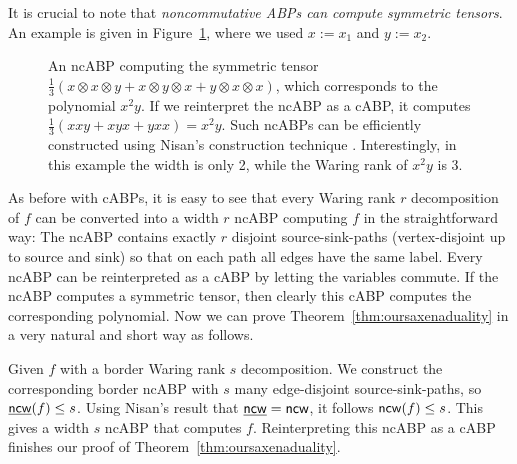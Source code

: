 \documentclass[10pt,a4paper]{article}
\numberwithin{equation}{section}
\theoremstyle{definition}
\newcommand{\ncw}{\textup{\textsf{ncw}}}
\begin{document}
It is crucial to note that \emph{noncommutative ABPs can compute symmetric tensors}.
An example is given in Figure~\ref{fig:ncabp}, where we used $x:=x_1$ and $y:=x_2$.
\begin{figure}
\centering
{}
\caption{An ncABP computing the symmetric tensor $\frac 1 3 (x\otimes x\otimes y + x\otimes y\otimes x + y\otimes x\otimes x)$, which corresponds to the polynomial $x^2 y$.
If we reinterpret the ncABP as a cABP, it computes $\frac 1 3 (xxy + xyx + yxx)= x^2 y$.
Such ncABPs can be efficiently constructed using Nisan's construction technique \cite{nisan1991lower}. Interestingly, in this example the width is only 2, while the Waring rank of $x^2 y$ is 3.}
\label{fig:ncabp}
\end{figure}
As before with cABPs, it is easy to see that every Waring rank $r$ decomposition of $f$ can be converted into a width $r$ ncABP computing $f$ in the straightforward way: The ncABP contains exactly $r$ disjoint source-sink-paths (vertex-disjoint up to source and sink) so that on each path all edges have the same label.
Every ncABP can be reinterpreted as a cABP by letting the variables commute. If the ncABP computes a symmetric tensor, then clearly this cABP computes the corresponding polynomial.
Now we can prove Theorem~\ref{thm:oursaxenaduality} in a very natural and short way as follows.

Given $f$ with a border Waring rank $s$ decomposition. We construct the corresponding border ncABP with $s$ many edge-disjoint source-sink-paths, so $\underline{\ncw}(f)\leq s$.
Using Nisan's result \cite{nisan1991lower} that $\underline{\ncw}=\ncw$, it follows $\ncw(f)\leq s$.
This gives a width $s$ ncABP that computes $f$.
Reinterpreting this ncABP as a cABP finishes our proof of Theorem~\ref{thm:oursaxenaduality}.
\end{document}
